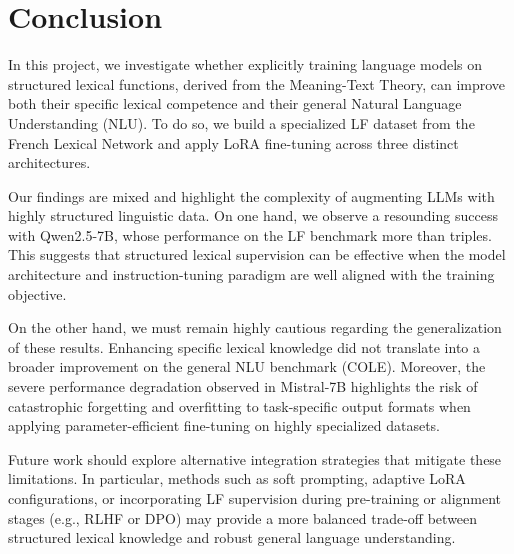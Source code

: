 \documentclass[11pt]{article}
\begin{document}
\section{Conclusion}
In this project, we investigate whether explicitly training language models on structured lexical functions, derived from the Meaning-Text Theory, can improve both their specific lexical competence and their general Natural Language Understanding (NLU). To do so, we build a specialized LF dataset from the French Lexical Network and apply LoRA fine-tuning across three distinct architectures.

Our findings are mixed and highlight the complexity of augmenting LLMs with highly structured linguistic data. On one hand, we observe a resounding success with Qwen2.5-7B, whose performance on the LF benchmark more than triples. This suggests that structured lexical supervision can be effective when the model architecture and instruction-tuning paradigm are well aligned with the training objective.

On the other hand, we must remain highly cautious regarding the generalization of these results. Enhancing specific lexical knowledge did not translate into a broader improvement on the general NLU benchmark (COLE). Moreover, the severe performance degradation observed in Mistral-7B highlights the risk of catastrophic forgetting and overfitting to task-specific output formats when applying parameter-efficient fine-tuning on highly specialized datasets. 

Future work should explore alternative integration strategies that mitigate these limitations. In particular, methods such as soft prompting, adaptive LoRA configurations, or incorporating LF supervision during pre-training or alignment stages (e.g., RLHF or DPO) may provide a more balanced trade-off between structured lexical knowledge and robust general language understanding.
\newpage


\newpage
\appendix
\end{document}

